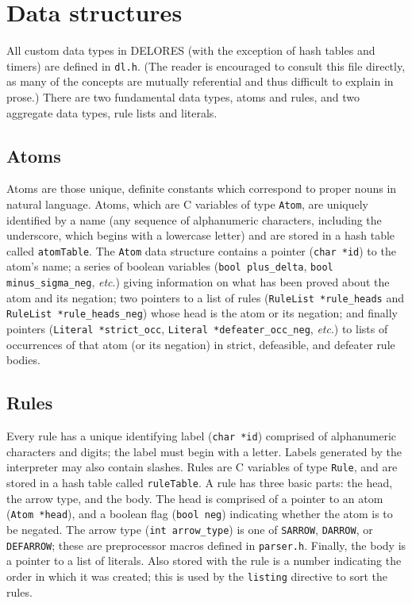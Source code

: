 \documentclass[a4paper,10pt,twocolumn]{article}
\begin{document}
\section{Data structures}

All custom data types in DELORES (with the exception of hash tables
and timers) are defined in \texttt{dl.h}. (The reader is encouraged to
consult this file directly, as many of the concepts are mutually
referential and thus difficult to explain in prose.) There are two
fundamental data types, atoms and rules, and two aggregate data types,
rule lists and literals.

\subsection{Atoms}

Atoms are those unique, definite constants which correspond to proper
nouns in natural language. Atoms, which are C variables of type
\texttt{Atom}, are uniquely identified by a name (any sequence of
alphanumeric characters, including the underscore, which begins with a
lowercase letter) and are stored in a hash table called
\texttt{atomTable}. The \texttt{Atom} data structure contains a
pointer (\texttt{char *id}) to the atom's name; a series of boolean
variables (\texttt{bool plus\_delta}, \texttt{bool minus\_sigma\_neg},
\textit{etc}.)  giving information on what has been proved about the
atom and its negation; two pointers to a list of rules
(\texttt{RuleList *rule\_heads} and \texttt{RuleList
  *rule\_heads\_neg}) whose head is the atom or its negation; and
finally pointers (\texttt{Literal *strict\_occ}, \texttt{Literal
  *defeater\_occ\_neg}, \textit{etc}.) to lists of occurrences of that
atom (or its negation) in strict, defeasible, and defeater rule
bodies.

\subsection{Rules}

Every rule has a unique identifying label (\texttt{char *id})
comprised of alphanumeric characters and digits; the label must begin
with a letter. Labels generated by the interpreter may also contain
slashes.  Rules are C variables of type \texttt{Rule}, and are stored
in a hash table called \texttt{ruleTable}. A rule has three basic
parts: the head, the arrow type, and the body. The head is comprised
of a pointer to an atom (\texttt{Atom *head}), and a boolean flag
(\texttt{bool neg}) indicating whether the atom is to be negated. The
arrow type (\texttt{int arrow\_type}) is one of \texttt{SARROW},
\texttt{DARROW}, or \texttt{DEFARROW}; these are preprocessor macros
defined in \texttt{parser.h}. Finally, the body is a pointer to a list
of literals. Also stored with the rule is a number indicating the
order in which it was created; this is used by the \texttt{listing}
directive to sort the rules.
\end{document}
